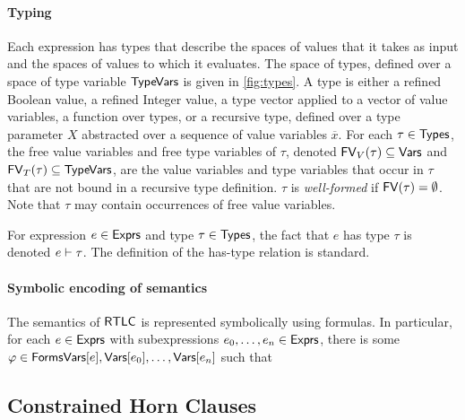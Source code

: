 \paragraph{Typing}
%
Each expression has types that describe the spaces of values that it
takes as input and the spaces of values to which it evaluates.
%
The space of types, defined over a space of type variable $\mathsf{TypeVars}$
is given in \autoref{fig:types}.
%
A type is either a refined Boolean value, %
a refined Integer value, %
a type vector applied to a vector of value variables, %
%
%
a function over types, %
%
or a recursive type, defined over a type parameter $X$ abstracted over
a sequence of value variables $\overline{x}$.
%
For each $\tau \in \mathsf{Types}$, the free value variables and free type
variables of $\tau$, denoted $\mathsf{FV}_V(\tau) \subseteq \mathsf{Vars}$
and $\mathsf{FV}_T(\tau) \subseteq \mathsf{TypeVars}$, are the value variables
and type variables that occur in $\tau$ that are not bound in a
recursive type definition.
%
$\tau$ is \emph{well-formed} if $\mathsf{FV}(\tau) = \emptyset$.
%
Note that $\tau$ may contain occurrences of free value variables.

For expression $e \in \mathsf{Exprs}$ and type $\tau \in \mathsf{Types}$, the fact that
$e$ has type $\tau$ is denoted $e \vdash \tau$.
%
The definition of the has-type relation is standard.

\paragraph{Symbolic encoding of semantics}
%
The semantics of $\mathsf{RTLC}$ is represented symbolically using \lia
formulas.
%
%
In particular, for each $e \in \mathsf{Exprs}$ with subexpressions $e_0,
\ldots, e_n \in \mathsf{Exprs}$, there is some $\varphi \in \mathsf{Forms}{\mathsf{Vars}[e],
  \mathsf{Vars}[e_0], \ldots, \mathsf{Vars}[e_n]}$ such that


\subsection{Constrained Horn Clauses}
\label{sec:chcs}

